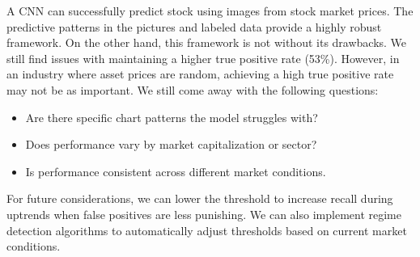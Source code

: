 \documentclass[12pt]{article}
\begin{document}
A CNN can successfully predict stock using images from stock market prices. The predictive patterns in the pictures and labeled data provide a highly robust framework. On the other hand, this framework is not without its drawbacks. We still find issues with maintaining a higher true positive rate (53\%). However, in an industry where asset prices are random, achieving a high true positive rate may not be as important. We still come away with the following questions:

\begin{itemize}
	\item Are there specific chart patterns the model struggles with?
	\item Does performance vary by market capitalization or sector?
	\item Is performance consistent across different market conditions.
\end{itemize}
For future considerations, we can lower the threshold to increase recall during uptrends when false positives are less punishing. We can also implement regime detection algorithms to automatically adjust thresholds based on current market conditions.
\end{document}
